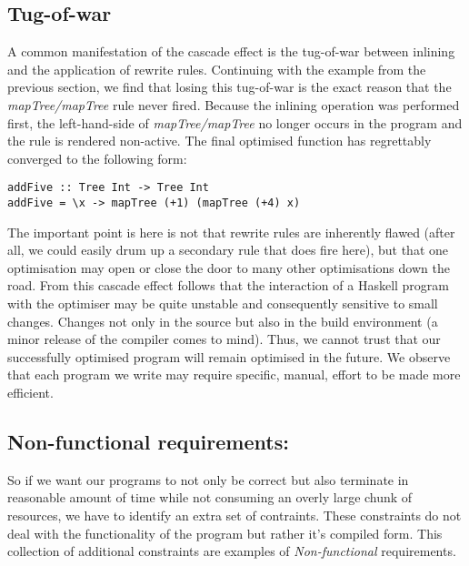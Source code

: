 \subsection{Tug-of-war}
\label{section:introduction:tug_of_war}

A common manifestation of the cascade effect is the tug-of-war between inlining and the application
of rewrite rules. Continuing with the  example from the previous section, we find that losing this
tug-of-war is the exact reason that the \textit{mapTree/mapTree} rule never fired. Because the inlining operation
was performed first, the left-hand-side of \textit{mapTree/mapTree} no longer occurs in the program and the rule
is rendered non-active. The final optimised function has regrettably converged to the following form:

\begin{verbatim}
addFive :: Tree Int -> Tree Int
addFive = \x -> mapTree (+1) (mapTree (+4) x)
\end{verbatim}

The important point is here is not that rewrite rules are inherently flawed (after all, we could easily
drum up a secondary rule that does fire here), but that one optimisation
may open or close the door to many other optimisations down the road.
From this cascade effect follows that the interaction of a Haskell program
with the optimiser may be quite unstable and consequently sensitive to small changes. 
Changes not only in the source but also in the build environment (a minor release of
the compiler comes to mind). Thus, we cannot trust that our successfully optimised program will remain
optimised in the future. We observe that each program we write may require specific, manual, 
effort to be made more efficient.

\subsection{Non-functional requirements: }
\label{section:introduction_inspection_testing}

So if we want our programs to not only be correct but also terminate in reasonable amount of time while
not consuming an overly large chunk of resources, we have to identify an extra set of contraints. 
These constraints do not deal with the functionality of the program but rather it's compiled form.
This collection of additional constraints are examples of \textit{Non-functional} requirements. 

